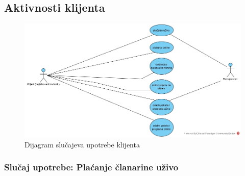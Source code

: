 \documentclass[a4paper]{article}
\begin{document}
\subsection{Aktivnosti klijenta}
\begin{figure}[!ht]
\begin{center}
\includegraphics[scale=0.45]{sections/images/dijagram_slucajeva_upotrebe_klijenta.jpg}
\end{center}
\caption{Dijagram slučajeva upotrebe klijenta}
\label{fig:kontekst}
\end{figure}

\subsubsection{Slučaj upotrebe: Plaćanje članarine uživo}

\end{document}

